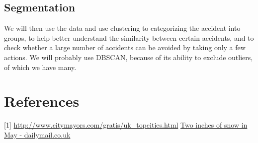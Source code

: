 \documentclass[a4paper, 10pt]{article}
\begin{document}
\subsection{Segmentation}
We will then use the data and use clustering to categorizing the accident into groups, to help better understand the similarity between certain accidents, and to check whether a large number of accidents can be avoided by taking only a few actions. We will probably use DBSCAN, because of its ability to exclude outliers, of which we have many.

   
\section{References}
 [1] \url{http://www.citymayors.com/gratis/uk\_topcities.html}
 \newline
 [2] \href{http://www.dailymail.co.uk/news/article-2324803/UK-weather-Its-middle-May-Two-inches-snow-months-rainfall-day-65mph-winds-hit-Britain.html} {Two inches of snow in May - dailymail.co.uk}
\end{document}
